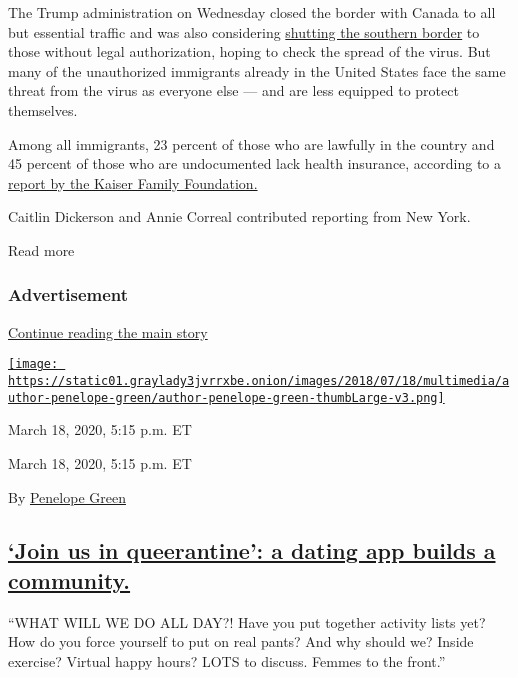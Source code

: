 The Trump administration on Wednesday closed the border with Canada to
all but essential traffic and was also considering
\href{https://www.nytimes3xbfgragh.onion/2020/03/17/us/politics/trump-coronavirus-mexican-border.html?searchResultPosition=1}{shutting
the southern border} to those without legal authorization, hoping to
check the spread of the virus. But many of the unauthorized immigrants
already in the United States face the same threat from the virus as
everyone else --- and are less equipped to protect themselves.

Among all immigrants, 23 percent of those who are lawfully in the
country and 45 percent of those who are undocumented lack health
insurance, according to a
\href{https://www.kff.org/disparities-policy/fact-sheet/health-coverage-of-immigrants/}{report
by the Kaiser Family Foundation.}

Caitlin Dickerson and Annie Correal contributed reporting from New York.

Read more

\hypertarget{advertisement-3}{%
\subsubsection{Advertisement}\label{advertisement-3}}

\protect\hyperlink{after-dfp-ad-mid4}{Continue reading the main story}

\href{https://www.nytimes3xbfgragh.onion/by/penelope-green}{\texttt{[image: https://static01.graylady3jvrrxbe.onion/images/2018/07/18/multimedia/author-penelope-green/author-penelope-green-thumbLarge-v3.png]}}

March 18, 2020, 5:15 p.m. ET

March 18, 2020, 5:15 p.m. ET

By \href{https://www.nytimes3xbfgragh.onion/by/penelope-green}{Penelope
Green}

\hypertarget{join-us-in-queerantine-a-dating-app-builds-a-community}{%
\subsection{\texorpdfstring{\protect\hyperlink{join-us-in-queerantine-a-dating-app-builds-a-community}{`Join
us in queerantine': a dating app builds a
community.}}{`Join us in queerantine': a dating app builds a community.}}\label{join-us-in-queerantine-a-dating-app-builds-a-community}}

``WHAT WILL WE DO ALL DAY?! Have you put together activity lists yet?
How do you force yourself to put on real pants? And why should we?
Inside exercise? Virtual happy hours? LOTS to discuss. Femmes to the
front.''

